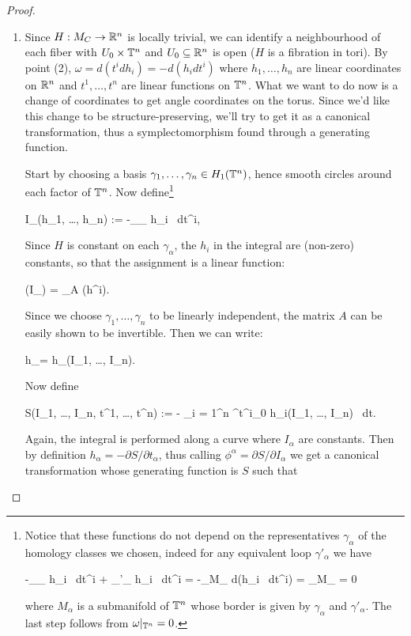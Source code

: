 \documentclass[main.tex]{subfiles}
\begin{document}
\begin{proof}
\begin{enumerate}
		\item Since ${H: M_C \to \mathbb{R}^n}$ is locally trivial, we can identify a neighbourhood of each fiber with $U_0 \times \mathbb{T}^n$ and $U_0 \subseteq \mathbb{R}^n$ is open ($H$ is a fibration in tori). By point (2), $\omega = d(t^i dh_i) = -d(h_i dt^i)$ where $h_1, \ldots, h_n$ are linear coordinates on $\mathbb{R}^n$ and $t^1, \ldots, t^n$ are linear functions on $\mathbb{T}^n$. What we want to do now is a change of coordinates to get angle coordinates on the torus. Since we'd like this change to be structure-preserving, we'll try to get it as a canonical transformation, thus a symplectomorphism found through a generating function.

		Start by choosing a basis $\gamma_1, \ldots, \gamma_n \in H_1(\mathbb{T}^n)$, hence smooth circles around each factor of $\mathbb{T}^n$. Now define\footnote{Notice that these functions do not depend on the representatives $\gamma_\alpha$ of the homology classes we chosen, indeed for any equivalent loop $\gamma'_\alpha$ we have 
		\begin{eqalign}
			-\int_{\gamma_\alpha} h_i \, dt^i + \int_{\gamma'_\alpha} h_i \, dt^i = -\int_{M_\alpha} d(h_i \, dt^i) =  \int_{M_\alpha} \omega = 0
		\end{eqalign}
		where $M_\alpha$ is a submanifold of $\mathbb{T}^n$ whose border is given by $\gamma_\alpha$ and $\gamma'_\alpha$. The last step follows from $\omega\vert_{\mathbb{T}^n}=0$.}
		\begin{eqalign}
			I_\alpha(h_1, \ldots, h_n) := -\int_{\gamma_\alpha} h_i \, dt^i,
		\end{eqalign}
		Since $H$ is constant on each $\gamma_\alpha$, the $h_i$ in the integral are (non-zero) constants, so that the assignment is a linear function:
		\begin{eqalign}
			(I_\alpha) = _A (h^i).
		\end{eqalign}
		Since we choose $\gamma_1, \ldots, \gamma_n$ to be linearly independent, the matrix $A$ can be easily shown to be invertible. Then we can write:
		\begin{eqalign}
			h_\alpha = h_\alpha(I_1, \ldots, I_n).
		\end{eqalign}
		Now define
		\begin{eqalign}
			S(I_1, \ldots, I_n, t^1, \ldots, t^n) := - \sum_{i = 1}^n \int^{t^i}_{0} h_i(I_1, \ldots, I_n) \, dt.
		\end{eqalign}
		Again, the integral is performed along a curve where $I_\alpha$ are constants. Then by definition $h_\alpha = -\partial S / \partial t_\alpha$, thus calling $\phi^\alpha = \partial S / \partial I_\alpha$ we get a canonical transformation whose generating function is $S$ such that

\end{enumerate}
\end{proof}
\end{document}
